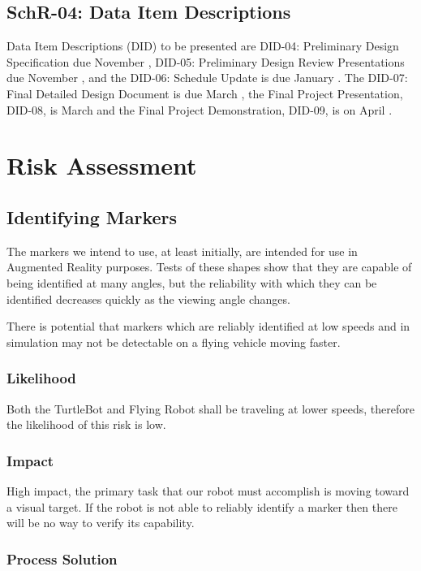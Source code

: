 \documentclass{article}
\begin{document}
		\subsection{SchR-04: Data Item Descriptions}
		Data Item Descriptions (DID) to be presented are DID-04: Preliminary Design Specification due November , DID-05: Preliminary Design Review Presentations due November , and the DID-06: Schedule Update is due January . The DID-07: Final Detailed Design Document is due March , the Final Project Presentation, DID-08, is March  and the Final Project Demonstration, DID-09, is on April . 
		

\section{Risk Assessment}

	\subsection{Identifying Markers}
	
	The markers we intend to use, at least initially, are intended for use in Augmented Reality purposes. Tests of these shapes show that they are capable of being identified at many angles, but the reliability with which they can be identified decreases quickly as the viewing angle changes. 
	
	There is potential that markers which are reliably identified at low speeds and in simulation may not be detectable on a flying vehicle moving faster.
	
		\subsubsection{Likelihood}
 
		Both the TurtleBot and Flying Robot shall be traveling at lower speeds, therefore the likelihood of this risk is low.
		
		\subsubsection{Impact}
		
		High impact, the primary task that our robot must accomplish is moving toward a visual target. If the robot is not able to reliably identify a marker then there will be no way to verify its capability.
		
		\subsubsection{Process Solution}
		
\end{document}

